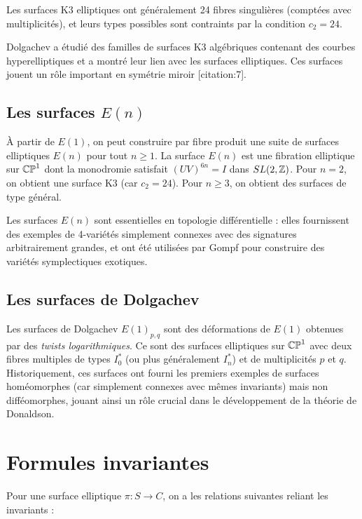 Les surfaces K3 elliptiques ont généralement 24 fibres singulières (comptées avec multiplicités), et leurs types possibles sont contraints par la condition $c_2 = 24$.

\begin{exemple}
Dolgachev a étudié des familles de surfaces K3 algébriques contenant des courbes hyperelliptiques et a montré leur lien avec les surfaces elliptiques. Ces surfaces jouent un rôle important en symétrie miroir [citation:7].
\end{exemple}

\subsection{Les surfaces $E(n)$}

À partir de $E(1)$, on peut construire par fibre produit une suite de surfaces elliptiques $E(n)$ pour tout $n \ge 1$. La surface $E(n)$ est une fibration elliptique sur $\mathbb{CP}^1$ dont la monodromie satisfait $(UV)^{6n} = I$ dans $SL(2,\mathbb{Z})$. Pour $n=2$, on obtient une surface K3 (car $c_2 = 24$). Pour $n \ge 3$, on obtient des surfaces de type général.

Les surfaces $E(n)$ sont essentielles en topologie différentielle : elles fournissent des exemples de 4-variétés simplement connexes avec des signatures arbitrairement grandes, et ont été utilisées par Gompf pour construire des variétés symplectiques exotiques.

\subsection{Les surfaces de Dolgachev}

Les surfaces de Dolgachev $E(1)_{p,q}$ sont des déformations de $E(1)$ obtenues par des \emph{twists logarithmiques}. Ce sont des surfaces elliptiques sur $\mathbb{CP}^1$ avec deux fibres multiples de types $I_0^*$ (ou plus généralement $I_n^*$) et de multiplicités $p$ et $q$. Historiquement, ces surfaces ont fourni les premiers exemples de surfaces homéomorphes (car simplement connexes avec mêmes invariants) mais non difféomorphes, jouant ainsi un rôle crucial dans le développement de la théorie de Donaldson.

\section{Formules invariantes}

Pour une surface elliptique $\pi: S \to C$, on a les relations suivantes reliant les invariants :

